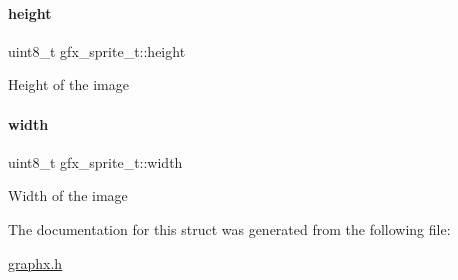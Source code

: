 \paragraph{\texorpdfstring{height}{height}}
{\footnotesize\ttfamily uint8\+\_\+t gfx\+\_\+sprite\+\_\+t\+::height}

Height of the image \mbox{\label{structgfx__sprite__t_a5c2835a8d10b855c322330edcedb96a9}} 
\paragraph{\texorpdfstring{width}{width}}
{\footnotesize\ttfamily uint8\+\_\+t gfx\+\_\+sprite\+\_\+t\+::width}

Width of the image 

The documentation for this struct was generated from the following file\+:\begin{DoxyCompactItemize}
\item 
\hyperlink{graphx_8h}{graphx.\+h}\end{DoxyCompactItemize}

